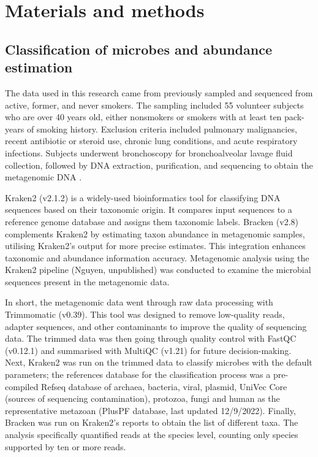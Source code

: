 \documentclass[10pt,letterpaper]{article}
\begin{document}
\section*{Materials and methods}
\subsection*{Classification of microbes and abundance estimation}
The data used in this research came from previously sampled and sequenced from active, former, and never smokers. The sampling included 55 volunteer subjects who are over 40 years old, either nonsmokers or smokers with at least ten pack-years of smoking history. Exclusion criteria included pulmonary malignancies, recent antibiotic or steroid use, chronic lung conditions, and acute respiratory infections. Subjects underwent bronchoscopy for bronchoalveolar lavage fluid collection, followed by DNA extraction, purification, and sequencing to obtain the metagenomic DNA \parencite{campos-2023}. 

\noindent Kraken2 (v2.1.2)\parencite{wood-2019} is a widely-used bioinformatics tool for classifying DNA sequences based on their taxonomic origin. It compares input sequences to a reference genome database and assigns them taxonomic labels. Bracken (v2.8)\parencite{alam-2017} complements Kraken2 by estimating taxon abundance in metagenomic samples, utilising Kraken2's output for more precise estimates. This integration enhances taxonomic and abundance information accuracy. Metagenomic analysis using the Kraken2 pipeline (Nguyen, unpublished) was conducted to examine the microbial sequences present in the metagenomic data. 

\noindent In short, the metagenomic data went through raw data processing with Trimmomatic (v0.39)\parencite{bolger-2014}. This tool was designed to remove low-quality reads, adapter sequences, and other contaminants to improve the quality of sequencing data. The trimmed data was then going through quality control with FastQC (v0.12.1)\parencite{Andrews:2010tn} and summarised with MultiQC (v1.21)\parencite{ewels-2016} for future decision-making. Next, Kraken2 was run on the trimmed data to classify microbes with the default parameters; the references database for the classification process was a pre-compiled Refseq database of archaea, bacteria, viral, plasmid, UniVec Core (sources of sequencing contamination), protozoa, fungi and human as the representative metazoan (PlusPF database, last updated 12/9/2022). Finally, Bracken was run on Kraken2’s reports to obtain the list of different taxa. The analysis specifically quantified reads at the species level, counting only species supported by ten or more reads.
\end{document}
